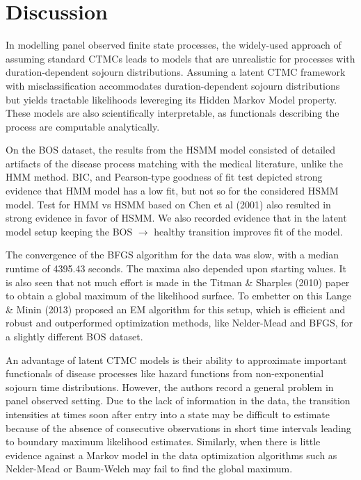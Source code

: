 \documentclass{uwstat572}
\begin{document}
\section{Discussion}

In modelling panel observed finite state processes, the widely-used approach of assuming standard CTMCs leads to models that are unrealistic for processes with duration-dependent sojourn distributions. Assuming a latent CTMC framework with misclassification accommodates duration-dependent sojourn distributions but yields tractable likelihoods levereging its Hidden Markov Model property. These models are also scientifically interpretable, as functionals describing the process are computable analytically.

On the BOS dataset, the results from the HSMM model consisted of detailed artifacts of the disease process matching with the medical literature, unlike the HMM method. BIC, and Pearson-type goodness of fit test depicted strong evidence that HMM model has a low fit, but not so for the considered HSMM model. Test for HMM vs HSMM based on Chen et al (2001) also resulted in strong evidence in favor of HSMM. We also recorded evidence that in the latent model setup keeping the BOS $\rightarrow$ healthy transition improves fit of the model.

The convergence of the BFGS algorithm for the data was slow, with a median runtime of 4395.43 seconds. The maxima also depended upon starting values. It is also seen that not much effort is made in the Titman \& Sharples (2010) paper to obtain a global maximum of the likelihood surface. To embetter on this Lange \& Minin (2013) proposed an EM algorithm for this setup, which is efficient and robust and outperformed optimization methods, like Nelder-Mead and BFGS, for a slightly different BOS dataset.

An advantage of latent CTMC models is their ability to approximate important functionals of disease processes like hazard functions from non-exponential sojourn time distributions. However, the authors record a general problem in panel observed setting. Due to the lack of information in the data, the transition intensities at times soon after entry into a state may be difficult to estimate because of the absence of consecutive observations in short time intervals leading to boundary maximum likelihood estimates. Similarly, when there is little evidence against a Markov model in the data optimization algorithms such as Nelder-Mead or Baum-Welch may fail to find the global maximum.
\end{document}
